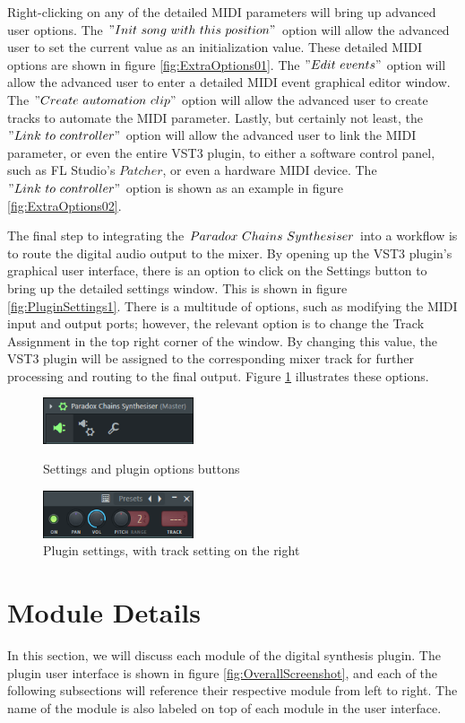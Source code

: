 \documentclass[a4paper,12pt]{report}
\begin{document}
Right-clicking on any of the detailed MIDI parameters will bring up advanced user options. The $"Init\ \-song\ \-with\ \-this\ \-position"$ option will allow the advanced user to set the current value as an initialization value. These detailed MIDI options are shown in figure \ref{fig:ExtraOptions01}. The $"Edit\ \-events"$ option will allow the advanced user to enter a detailed MIDI event graphical editor window. The $"Create\ \-automation\ \-clip"$ option will allow the advanced user to create tracks to automate the MIDI parameter. Lastly, but certainly not least, the $"Link\ \-to\ \-controller"$ option will allow the advanced user to link the MIDI parameter, or even the entire VST3 plugin, to either a software control panel, such as FL Studio's $Patcher$, or even a hardware MIDI device. The $"Link\ \-to\ \-controller"$ option is shown as an example in figure \ref{fig:ExtraOptions02}.

The final step to integrating the $Paradox\ \-Chains\ \-Synthesiser$ into a workflow is to route the digital audio output to the mixer. By opening up the VST3 plugin's graphical user interface, there is an option to click on the Settings button to bring up the detailed settings window. This is shown in figure \ref{fig:PluginSettings1}. There is a multitude of options, such as modifying the MIDI input and output ports; however, the relevant option is to change the Track Assignment in the top right corner of the window. By changing this value, the VST3 plugin will be assigned to the corresponding mixer track for further processing and routing to the final output. Figure \ref{fig:PluginSettings2} illustrates these options.

\begin{figure}
    \centering
    \includegraphics[width=12em]{PluginSettings1.png}
    \caption{Settings and plugin options buttons}
    \label{fig:PluginSettings1}
    \includegraphics[width=12em]{PluginSettings2.png}
    \caption{Plugin settings, with track setting on the right}
    \label{fig:PluginSettings2}
\end{figure}

\section{Module Details}
\label{sec:moduledetails}
In this section, we will discuss each module of the digital synthesis plugin. The plugin user interface is shown in figure \ref{fig:OverallScreenshot}, and each of the following subsections will reference their respective module from left to right. The name of the module is also labeled on top of each module in the user interface.
\end{document}

